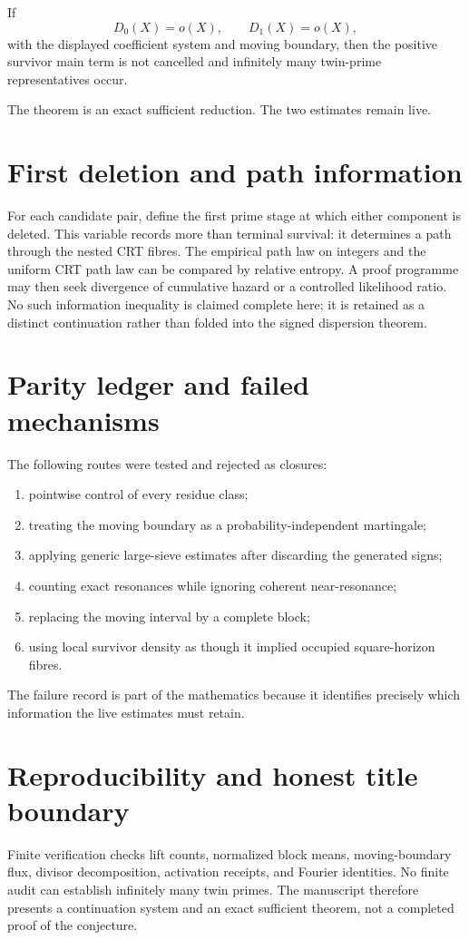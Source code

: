 \documentclass[11pt,a4paper]{article}
\begin{document}
\begin{theorem}
If
\begin{equation}
D_0(X)=o(X),\qquad D_1(X)=o(X),
\end{equation}
with the displayed coefficient system and moving boundary, then the positive survivor main term is not cancelled and infinitely many twin-prime representatives occur.
\end{theorem}
The theorem is an exact sufficient reduction. The two estimates remain live.

\section{First deletion and path information}
For each candidate pair, define the first prime stage at which either component is deleted. This variable records more than terminal survival: it determines a path through the nested CRT fibres. The empirical path law on integers and the uniform CRT path law can be compared by relative entropy. A proof programme may then seek divergence of cumulative hazard or a controlled likelihood ratio. No such information inequality is claimed complete here; it is retained as a distinct continuation rather than folded into the signed dispersion theorem.

\section{Parity ledger and failed mechanisms}
The following routes were tested and rejected as closures:
\begin{enumerate}
\item pointwise control of every residue class;
\item treating the moving boundary as a probability-independent martingale;
\item applying generic large-sieve estimates after discarding the generated signs;
\item counting exact resonances while ignoring coherent near-resonance;
\item replacing the moving interval by a complete block;
\item using local survivor density as though it implied occupied square-horizon fibres.
\end{enumerate}
The failure record is part of the mathematics because it identifies precisely which information the live estimates must retain.

\section{Reproducibility and honest title boundary}
Finite verification checks lift counts, normalized block means, moving-boundary flux, divisor decomposition, activation receipts, and Fourier identities. No finite audit can establish infinitely many twin primes. The manuscript therefore presents a continuation system and an exact sufficient theorem, not a completed proof of the conjecture.
\end{document}
